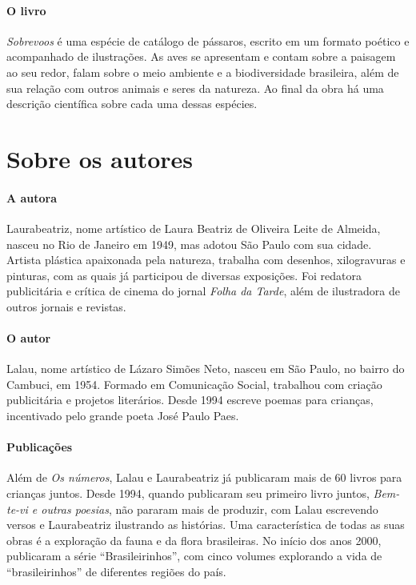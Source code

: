 \documentclass[11pt]{extarticle}
\begin{document}
\paragraph{O livro} \textit{Sobrevoos} é uma espécie de catálogo de pássaros, escrito em um formato poético e acompanhado de ilustrações. As aves se apresentam e contam sobre a paisagem ao seu redor, falam sobre o meio ambiente e a biodiversidade brasileira, além de sua relação com outros animais e seres da natureza. Ao final da obra há uma descrição científica sobre cada uma dessas espécies. 

\section{Sobre os autores}


\paragraph{A autora} Laurabeatriz, nome artístico de Laura Beatriz de Oliveira Leite de Almeida, nasceu no Rio de Janeiro em 1949, mas adotou São Paulo com sua cidade. Artista plástica apaixonada pela natureza, trabalha com desenhos, xilogravuras e pinturas, com as quais já participou de diversas exposições. Foi redatora publicitária e crítica de cinema do jornal \textit{Folha da Tarde}, além de ilustradora de outros jornais e revistas.

\paragraph{O autor} Lalau, nome artístico de Lázaro Simões Neto, nasceu em São Paulo, no bairro do Cambuci, em 1954. Formado em Comunicação Social, trabalhou com criação publicitária e projetos literários. Desde 1994 escreve poemas para crianças, incentivado pelo grande poeta José Paulo Paes.


\paragraph{Publicações} Além de \textit{Os números}, Lalau e Laurabeatriz já publicaram mais de 60 livros para crianças juntos. Desde 1994, quando publicaram seu primeiro livro juntos, \textit{Bem-te-vi e outras poesias}, não pararam mais de produzir, com Lalau escrevendo versos e Laurabeatriz ilustrando as histórias. Uma característica de todas as suas obras é a exploração da fauna e da flora brasileiras. No início dos anos 2000, publicaram a série ``Brasileirinhos'', com cinco volumes explorando a vida de ``brasileirinhos'' de diferentes regiões do país. 
\end{document}
